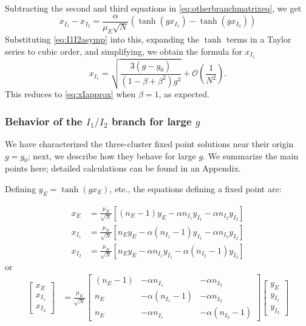 \documentclass[11pt,reqno]{amsart}
\begin{document}
Subtracting the second and third equations in \cref{eq:otherbranchmatrixeq}, we get
\[
 x_{I_1} - x_{I_2} = \frac{\alpha}{\mu_{E}\sqrt{N}}\left( \tanh(g x_{I_1}) - \tanh(g x_{I_2}) \right)
 \]
Substituting \cref{eq:I1I2asymp} into this, expanding the $\tanh$ terms in a Taylor series to cubic order, and simplifying, we obtain the formula for $x_{I_1}$
 \begin{equation}\label{eq:XI1}
 x_{I_1} = \sqrt{ \frac{ 3(g - g_0) }{ (1 - \beta + \beta^2 )g^3}} + \mathcal{O}\left( \frac{1}{N^2} \right).
 \end{equation}
This reduces to \cref{eq:xIapprox} when $\beta = 1$, as expected. 

\subsubsection{Behavior of the $I_1/I_2$ branch for large $g$} \label{sec:stab_largeg}
We have characterized the three-cluster fixed point solutions near their origin $g=g_0$; next, we describe how they behave for large $g$. We summarize the main points here; detailed calculations can be found in an Appendix.

Defining $y_E = \tanh(gx_E)$, etc., the equations defining a fixed point are:

 \begin{align*}
        x_E &= \frac{\mu_E}{\sqrt{N}} \left[ (n_E - 1)y_E - \alpha n_{I_1} y_{I_1} - \alpha n_{I_2} y_{I_2} \right] \\
        x_{I_1} &= \frac{\mu_E}{\sqrt{N}} \left[ n_E y_E - \alpha (n_{I_1}-1) y_{I_1} - \alpha n_{I_2} y_{I_2} \right] \\
        x_{I_2} &= \frac{\mu_E}{\sqrt{N}} \left[ n_E y_E - \alpha n_{I_1} y_{I_1} - \alpha (n_{I_2}-1) y_{I_2} \right] 
    \end{align*}
or
\begin{align}
 \begin{bmatrix} x_E\\x_{I_1}\\x_{I_2}\end{bmatrix} 
 &= \frac{\mu_E}{\sqrt{N}} 
 \begin{bmatrix} (n_E - 1) & -\alpha n_{I_1} & - \alpha n_{I_2}  \\
 n_E  & -\alpha (n_{I_1}-1) & - \alpha n_{I_2}  \\
 n_E  & -\alpha n_{I_1} & - \alpha (n_{I_2}-1)  
 \end{bmatrix}
 \begin{bmatrix} y_E\\y_{I_1}\\y_{I_2}\end{bmatrix} 
 \label{eq:3cluster_solution}
 \end{align}
\end{document}
